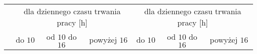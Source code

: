 \begin{table}[]
\begin{tabular}{|c|c|c|c|c|c|c|}
                                                                                                                                                                                                                                                                                                                                                                                                            & \multicolumn{3}{c|}{dla dziennego czasu trwania pracy {[}h{]}}                                                                                                                                                                                                                                                                                                                                                                                 & \multicolumn{3}{c|}{dla dziennego czasu trwania pracy {[}h{]}}                                                                                                                                                                                                                                                      \\ \cline{2-7}
                                                                                                                                                                                                                                                                                                                                                                                                            & do $10$                                                                                                                                      & od $10$ do $16$                                                                                                                                      & powyżej $16$                                                                                                                                     & do $10$                                                                                             & od $10$ do $16$                                                                                             & powyżej $16$                                                                                             \\ \hline

\end{tabular}
\end{table}
